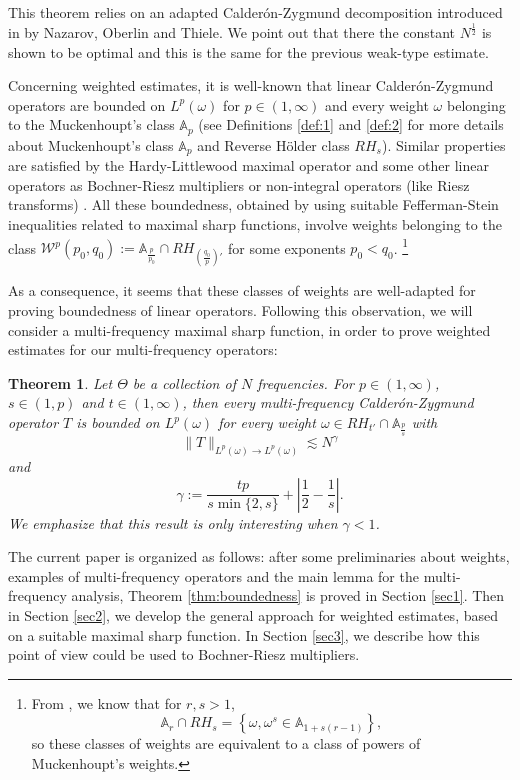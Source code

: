 \documentclass[11pt]{amsart}
\newtheorem{theorem}{Theorem}[section]
\theoremstyle{remark}
\begin{document}
This theorem relies on an adapted Calder\'on-Zygmund decomposition introduced in \cite{NOT} by Nazarov, Oberlin and Thiele. We point out that there the constant $N^{\frac{1}{2}}$ is shown to be optimal and this is the same for the previous weak-type estimate.

\bigskip
Concerning weighted estimates, it is well-known that linear Calder\'on-Zygmund operators are bounded on $L^p(\omega)$ for $p\in(1,\infty)$ and every weight $\omega$ belonging to the Muckenhoupt's class ${\mathbb A}_p$ (see Definitions \ref{def:1} and \ref{def:2} for more details about Muckenhoupt's class ${\mathbb A}_p$ and Reverse H\"older class $RH_s$). Similar properties are satisfied by the Hardy-Littlewood maximal operator and some other linear operators as Bochner-Riesz multipliers \cite{Vargas,CDL} or non-integral operators (like Riesz transforms) \cite{AM}. All these boundedness, obtained by using suitable Fefferman-Stein inequalities related to maximal sharp functions, involve weights belonging to the class ${\mathcal W}^p (p_0 , q_0 ) := {\mathbb A}_{\frac{p}{p_0}} \cap RH_{(\frac{q_0}{p})'}$ for some exponents $p_0<q_0$. 
\footnote{From \cite{JN}, we know that for $r,s>1$, 
$$ {\mathbb A}_{r} \cap RH_s = \left\{\omega, \omega^{s} \in{\mathbb A}_{1+s(r-1)}\right\},$$ so these classes of weights are equivalent to a class of powers of Muckenhoupt's weights.}

As a consequence, it seems that these classes of weights are well-adapted for proving boundedness of linear operators. Following this observation, we will consider a multi-frequency maximal sharp function, in order to prove weighted estimates for our multi-frequency operators:

\begin{theorem} \label{thm:weight} Let $\Theta$ be a collection of $N$ frequencies. For $p\in (1,\infty)$, $s\in(1,p)$ and $t\in(1,\infty)$, then every multi-frequency Calder\'on-Zygmund operator $T$ is bounded on $L^p(\omega)$ for every weight $\omega \in RH_{t'} \cap {\mathbb A}_{\frac{p}{s}}$ with
$$ \|T\|_{L^p(\omega) \to L^p(\omega)} \lesssim N^{\gamma}$$
and
$$ \gamma:=\frac{tp}{s\min\{2,s\}}+\left|\frac{1}{2}-\frac{1}{s}\right|.$$
We emphasize that this result is only interesting when $\gamma<1$.
\end{theorem}


\bigskip The current paper is organized as follows: after some preliminaries about weights, examples of multi-frequency operators and the main lemma for the multi-frequency analysis, Theorem \ref{thm:boundedness} is proved in Section \ref{sec1}. Then in Section \ref{sec2}, we develop the general approach for weighted estimates, based on a suitable maximal sharp function. In Section \ref{sec3}, we describe how this point of view could be used to Bochner-Riesz multipliers.
\end{document}
